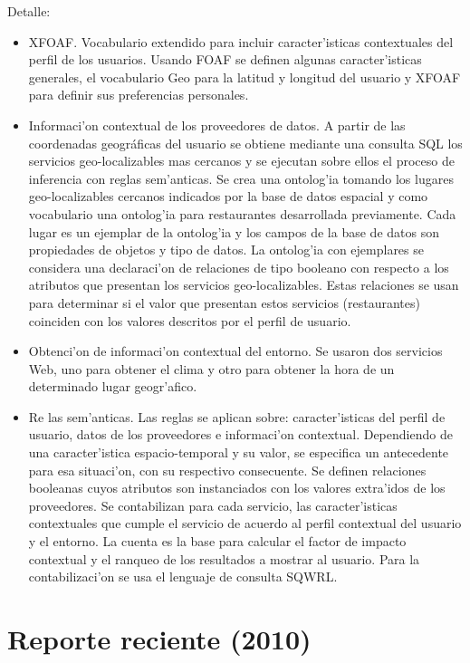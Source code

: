 \documentclass[11pt]{article}
\begin{document}
Detalle:
\begin{itemize}
\item XFOAF. Vocabulario extendido para incluir caracter'isticas contextuales del perfil de los usuarios. Usando FOAF se definen algunas caracter'isticas generales, el vocabulario Geo para la latitud y longitud del usuario y XFOAF para definir sus preferencias personales.
\item Informaci'on contextual de los proveedores de datos. A partir de las coordenadas geográficas del usuario se obtiene mediante una consulta SQL los servicios geo-localizables mas cercanos y se ejecutan sobre ellos el proceso de inferencia con reglas sem'anticas. Se crea una ontolog'ia tomando los lugares geo-localizables cercanos indicados por la base de datos espacial y como vocabulario una ontolog'ia para restaurantes desarrollada previamente. Cada lugar es un ejemplar de la ontolog'ia y los campos de la base de datos son propiedades de objetos y tipo de datos. La ontolog'ia con ejemplares se considera una declaraci'on de relaciones de tipo booleano con respecto a los atributos que presentan los servicios geo-localizables. Estas relaciones se usan para determinar si el valor que presentan estos servicios (restaurantes) coinciden con los valores descritos por el perfil de usuario.
\item Obtenci'on de informaci'on contextual del entorno. Se usaron dos servicios Web, uno para obtener el clima y otro para obtener la hora de un determinado lugar geogr'afico.
\item Re las sem'anticas. Las reglas se aplican sobre: caracter'isticas del perfil de usuario, datos de los proveedores e informaci'on contextual. Dependiendo de una caracter'istica espacio-temporal y su valor, se especifica un antecedente para esa situaci'on, con su respectivo consecuente. Se definen relaciones booleanas cuyos atributos son instanciados con los valores extra'idos de los proveedores. Se contabilizan para cada servicio, las caracter'isticas contextuales que cumple el servicio de acuerdo al perfil contextual del usuario y el entorno. La cuenta es la base para calcular el factor de impacto contextual y el ranqueo de los resultados a mostrar al usuario. Para la contabilizaci'on se usa el lenguaje de consulta SQWRL.
\end{itemize}

\section{Reporte reciente (2010)}
\end{document}
